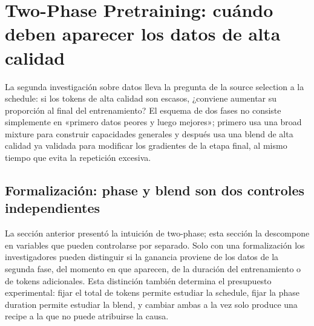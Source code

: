 \section{Two-Phase Pretraining: cuándo deben aparecer los datos de alta calidad}

La segunda investigación sobre datos lleva la pregunta de la source selection a la schedule: si los tokens de alta calidad son escasos, ¿conviene aumentar su proporción al final del entrenamiento? El esquema de dos fases no consiste simplemente en «primero datos peores y luego mejores»; primero usa una broad mixture para construir capacidades generales y después usa una blend de alta calidad ya validada para modificar los gradientes de la etapa final, al mismo tiempo que evita la repetición excesiva.








\subsection{Formalización: phase y blend son dos controles independientes}

La sección anterior presentó la intuición de two-phase; esta sección la descompone en variables que pueden controlarse por separado. Solo con una formalización los investigadores pueden distinguir si la ganancia proviene de los datos de la segunda fase, del momento en que aparecen, de la duración del entrenamiento o de tokens adicionales. Esta distinción también determina el presupuesto experimental: fijar el total de tokens permite estudiar la schedule, fijar la phase duration permite estudiar la blend, y cambiar ambas a la vez solo produce una recipe a la que no puede atribuirse la causa.

